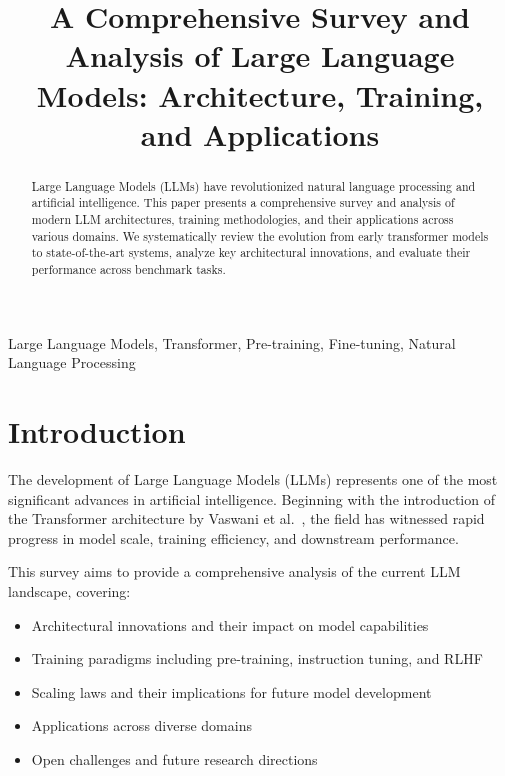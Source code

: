 \documentclass[conference]{IEEEtran}
\begin{document}
\title{A Comprehensive Survey and Analysis of Large Language Models: Architecture, Training, and Applications}

\author{
}

\maketitle

\begin{abstract}
Large Language Models (LLMs) have revolutionized natural language processing and artificial intelligence. This paper presents a comprehensive survey and analysis of modern LLM architectures, training methodologies, and their applications across various domains. We systematically review the evolution from early transformer models to state-of-the-art systems, analyze key architectural innovations, and evaluate their performance across benchmark tasks.
\end{abstract}

\begin{IEEEkeywords}
Large Language Models, Transformer, Pre-training, Fine-tuning, Natural Language Processing
\end{IEEEkeywords}

\section{Introduction}
\label{sec:intro}
The development of Large Language Models (LLMs) represents one of the most significant advances in artificial intelligence. Beginning with the introduction of the Transformer architecture by Vaswani et al.~\cite{vaswani2017attention}, the field has witnessed rapid progress in model scale, training efficiency, and downstream performance.

This survey aims to provide a comprehensive analysis of the current LLM landscape, covering:
\begin{itemize}
    \item Architectural innovations and their impact on model capabilities
    \item Training paradigms including pre-training, instruction tuning, and RLHF
    \item Scaling laws and their implications for future model development
    \item Applications across diverse domains
    \item Open challenges and future research directions
\end{itemize}
\end{document}
